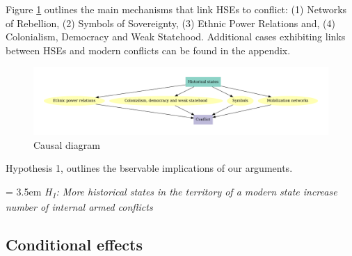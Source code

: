 \bigskip

Figure \ref{Fig: CausalDiagram} outlines the main mechanisms that link HSEs to
conflict: (1) Networks of Rebellion, (2) Symbols of Sovereignty, (3) Ethnic
Power Relations and, (4) Colonialism, Democracy and Weak Statehood. Additional cases exhibiting links between HSEs and modern conflicts can be found in the appendix.

    \begin{figure}[!htb] \hspace{-0,5cm} \includegraphics[width=\textwidth,
    height=\textheight, keepaspectratio]{img/graf.pdf} \caption{Causal diagram}
    \label{Fig: CausalDiagram} \end{figure}

Hypothesis 1, outlines the bservable implications of our arguments. 

\bigskip

\hangindent = 3.5em \textit{H\textsubscript{1}: More historical states in the
territory of a modern state increase number of internal armed conflicts}

\subsection{Conditional effects}

